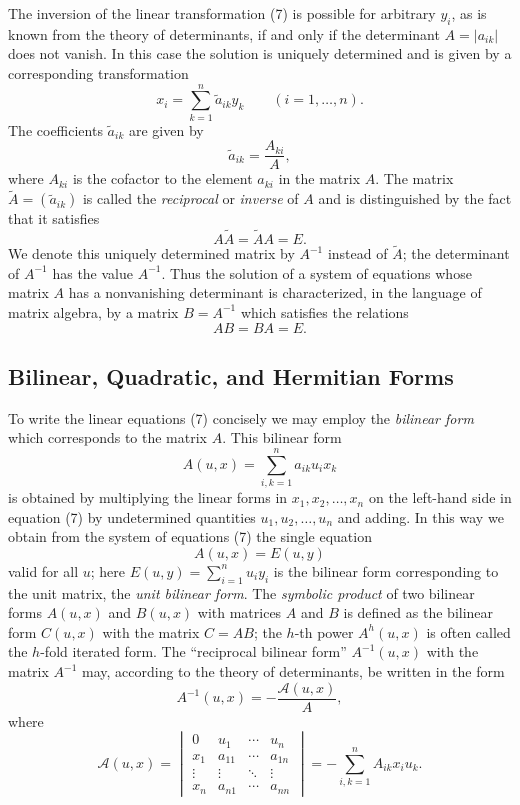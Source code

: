The inversion of the linear transformation (7) is possible for arbitrary $y_i$, as is known from the theory of determinants, if and only if the determinant $A=|a_{ik}|$ does not vanish. In this case the solution is uniquely determined and is given by a corresponding transformation
\begin{equation*}
x_i=\sum_{k=1}^{n}\tilde a_{ik}y_k\qquad(i=1,\ldots,n).
\tag{11}
\end{equation*}
The coefficients $\tilde a_{ik}$ are given by
\begin{equation*}
\tilde a_{ik}=\frac{A_{ki}}{A},
\tag{12}
\end{equation*}
where $A_{ki}$ is the cofactor to the element $a_{ki}$ in the matrix $A$. The matrix $\widetilde A=(\tilde a_{ik})$ is called the \emph{reciprocal} or \emph{inverse} of $A$ and is distinguished by the fact that it satisfies
\[
A\widetilde A=\widetilde A A=E.
\]
We denote this uniquely determined matrix by $A^{-1}$ instead of $\widetilde A$; the determinant of $A^{-1}$ has the value $A^{-1}$. Thus the solution of a system of equations whose matrix $A$ has a nonvanishing determinant is characterized, in the language of matrix algebra, by a matrix $B=A^{-1}$ which satisfies the relations
\[
AB=BA=E.
\]

\subsection{Bilinear, Quadratic, and Hermitian Forms}
To write the linear equations (7) concisely we may employ the \emph{bilinear form} which corresponds to the matrix $A$. This bilinear form
\begin{equation*}
A(u,x)=\sum_{i,k=1}^{n}a_{ik}u_i x_k
\tag{13}
\end{equation*}
is obtained by multiplying the linear forms in $x_1,x_2,\ldots,x_n$ on the left-hand side in equation (7) by undetermined quantities $u_1,u_2,\ldots,u_n$ and adding. In this way we obtain from the system of equations (7) the single equation
\begin{equation*}
A(u,x)=E(u,y)
\tag{14}
\end{equation*}
valid for all $u$; here $E(u,y)=\sum_{i=1}^{n}u_i y_i$ is the bilinear form corresponding to the unit matrix, the \emph{unit bilinear form}. The \emph{symbolic product} of two bilinear forms $A(u,x)$ and $B(u,x)$ with matrices $A$ and $B$ is defined as the bilinear form $C(u,x)$ with the matrix $C=AB$; the $h$-th power $A^h(u,x)$ is often called the $h$-fold iterated form. The ``reciprocal bilinear form'' $A^{-1}(u,x)$ with the matrix $A^{-1}$ may, according to the theory of determinants, be written in the form
\begin{equation*}
A^{-1}(u,x)=-\frac{\mathcal A(u,x)}{A},
\tag{15}
\end{equation*}
where
\[
\mathcal A(u,x)=
\begin{vmatrix}
0&u_1&\cdots&u_n\\
x_1&a_{11}&\cdots&a_{1n}\\
\vdots&\vdots&\ddots&\vdots\\
x_n&a_{n1}&\cdots&a_{nn}
\end{vmatrix}
=-\sum_{i,k=1}^{n}A_{ik}x_i u_k.
\]

